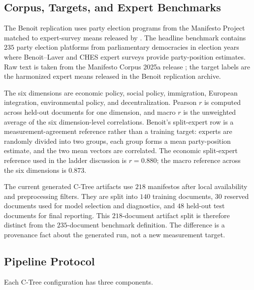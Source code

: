 \subsection{Corpus, Targets, and Expert Benchmarks}

The Benoit replication uses party election programs from the
Manifesto Project matched to expert-survey means released by
\citet{BenoitEtAl2025}. The
headline benchmark contains \(235\) party election platforms from parliamentary
democracies in election years where Benoit--Laver and CHES expert surveys
provide party-position estimates. Raw text is taken from the Manifesto Corpus
2025a release \citep{ManifestoProject2025a,ManifestoCorpus2025}; the target
labels are the harmonized expert means released in the Benoit replication
archive.

The six dimensions are economic policy, social policy, immigration, European
integration, environmental policy, and decentralization. Pearson \(r\) is
computed across held-out documents for one dimension, and macro \(r\) is the
unweighted average of the six dimension-level correlations. Benoit's
split-expert row is a measurement-agreement reference rather than a training
target: experts are randomly divided into two groups, each group forms a mean
party-position estimate, and the two mean vectors are correlated. The economic
split-expert reference used in the ladder discussion is \(r=0.880\); the macro
reference across the six dimensions is \(0.873\).

The current generated C-Tree artifacts use \(218\) manifestos after local
availability and preprocessing filters. They are split into \(140\) training
documents, \(30\) reserved documents used for model selection and diagnostics,
and \(48\) held-out test documents for final reporting. This \(218\)-document
artifact split is therefore distinct from the \(235\)-document benchmark
definition. The difference is a provenance fact about the generated run, not a
new measurement target.

\subsection{Pipeline Protocol}

Each C-Tree configuration has three components.

